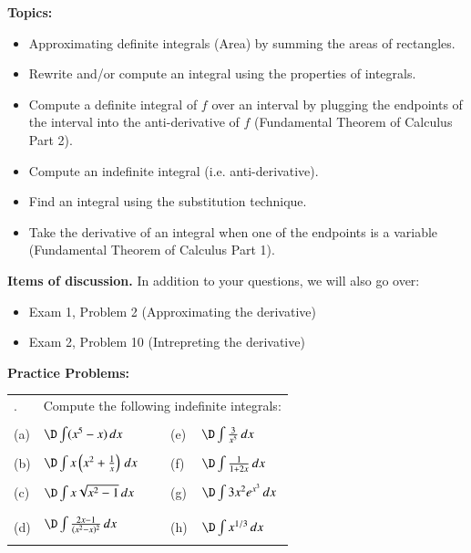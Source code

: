 \documentclass[11pt]{article}
\begin{document}


{\bf Topics:}

\vspace{0.2cm}

\begin{itemize}
	\item[$\Box$] Approximating definite integrals (Area) by summing the areas of rectangles.
	\item[$\Box$] Rewrite and/or compute an integral using the properties of integrals.
	\item[$\Box$] Compute a definite integral of $f$ over an interval by plugging the endpoints of the interval into the anti-derivative of $f$ (Fundamental Theorem of Calculus Part 2).
	\item[$\Box$] Compute an indefinite integral (i.e. anti-derivative).
	\item[$\Box$] Find an integral using the substitution technique.
	\item[$\Box$] Take the derivative of an integral when one of the endpoints is a variable (Fundamental Theorem of Calculus Part 1). 
\end{itemize}

{\bf Items of discussion. } In addition to your questions, we will also go over:

\vspace{0.2cm}

\begin{itemize}
	\item[$\Box$] Exam 1, Problem 2 (Approximating the derivative)
	\item[$\Box$] Exam 2, Problem 10 (Intrepreting the derivative)
\end{itemize}

\vspace{0.2cm}

\setcounter{N}{0}

{\bf Practice Problems:} 

\vspace{0.2cm}

{\setlength{\extrarowheight}{-0.1cm}
\begin{tabular}{p{0.24cm}p{6.0cm}p{1.0cm}p{0.24cm}p{6.0cm}}
	\arabic{N}. & \multicolumn{4}{l}{Compute the following indefinite integrals:}\\
	&\\
	(a) & $\D \int (x^5-x) \, dx$
	&&
	(e) & $\D \int \frac{3}{x^5} \, dx$ \\
	&\\
	(b) & $\D \int x\left(x^2 + \frac{1}{x}\right) \, dx$
	&&
	(f) & $\D \int \frac{1}{1+2x} \, dx$ \\
	&\\
	(c) & $\D \int x\sqrt{x^2-1} \, dx$
	&&
	(g) & $\D \int 3x^2 e^{x^{3}} \, dx$ \\
	&\\
	(d) & $\D \int \limits_{}^{} \frac{2x-1}{(x^2-x)^2} \, dx$
	&&
	(h) & $\D \int x^{1/3} \, dx$ \\
\end{tabular}}
\end{document}
